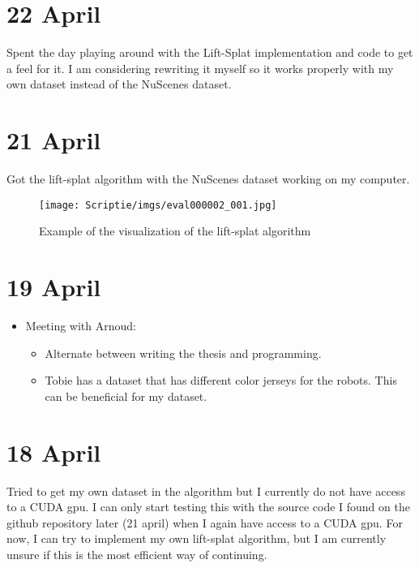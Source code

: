 \documentclass[twoside]{report}
\begin{document}
\section*{22 April}
Spent the day playing around with the Lift-Splat implementation and code to get a feel for it. I am considering rewriting it myself so it works properly with my own dataset instead of the NuScenes dataset.

\section*{21 April}
Got the lift-splat algorithm with the NuScenes dataset working on my computer.
        \begin{figure}[!h]
        \begin{centering}
        \texttt{[image: Scriptie/imgs/eval000002\_001.jpg]}
        \caption{Example of the visualization of the lift-splat algorithm}
        \end{centering}
        \end{figure}


\section*{19 April}
\begin{itemize}
    \item Meeting with Arnoud:
    \begin{itemize}
        \item Alternate between writing the thesis and programming. 
        \item Tobie has a dataset that has different color jerseys for the robots. This can be beneficial for my dataset.
    \end{itemize}
\end{itemize}

\section*{18 April}
Tried to get my own dataset in the algorithm but I currently do not have access to a CUDA gpu.  I can only start testing this with the source code I found on the github repository later (21 april) when I again have access to a CUDA gpu. For now, I can try to implement my own lift-splat algorithm, but I am currently unsure if this is the most efficient way of continuing.  
\end{document}
